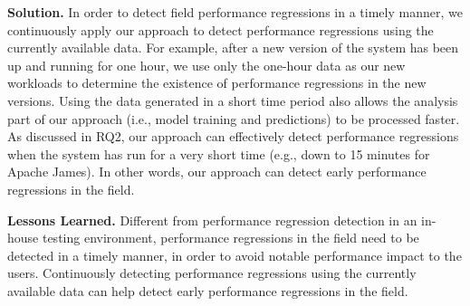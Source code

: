 \noindent\textbf{Solution.}
In order to detect field performance regressions in a timely manner, we continuously apply our approach to detect performance regressions using the currently available data.
For example, after a new version of the system has been up and running for one hour, we use only the one-hour data as our new workloads to determine the existence of performance regressions in the new versions.
Using the data generated in a short time period also allows the analysis part of our approach (i.e., model training and predictions) to be processed faster.
As discussed in RQ2, our approach can effectively detect performance regressions when the system has run for a very short time (e.g., down to 15 minutes for Apache James).
In other words, our approach can detect early performance regressions in the field.

\noindent\textbf{Lessons Learned.}
Different from performance regression detection in an in-house testing environment, performance regressions in the field need to be detected in a timely manner, in order to avoid notable performance impact to the users.
Continuously detecting performance regressions using the currently available data can help detect early performance regressions in the field.
